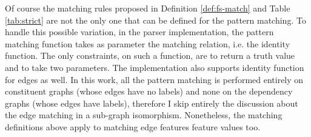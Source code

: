 %

Of course the matching rules proposed in Definition \ref{def:fs-match} and Table \ref{tab:strict} are not the only one that can be defined for the pattern matching. 
To handle this possible variation, in the parser implementation, the pattern matching function takes as parameter the matching relation, i.e. the identity function. The only constraints, on such a function, are to return a truth value and to take two parameters. The implementation also supports identity function for edges as well. In this work, all the pattern matching is performed entirely on constituent graphs (whose edges have no labels) and none on the dependency graphs (whose edges have labels), therefore I skip entirely the discussion about the edge matching in a sub-graph isomorphism. Nonetheless, the matching definitions above apply to matching edge features feature values too. 

